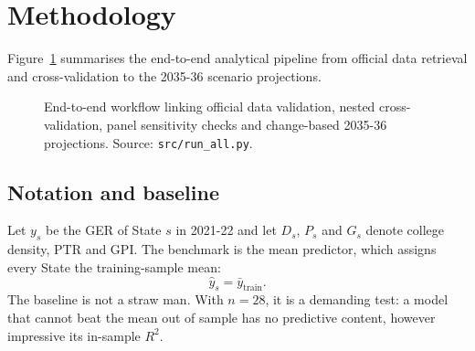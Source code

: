 \section{Methodology}\label{sec:methods}

Figure~\ref{fig:workflow} summarises the end-to-end analytical pipeline from official data retrieval and cross-validation to the 2035-36 scenario projections.

\begin{figure}[htbp]
\centering
{}
\caption{End-to-end workflow linking official data validation, nested cross-validation, panel sensitivity checks and change-based 2035-36 projections. Source: \texttt{src/run\_all.py}.}
\label{fig:workflow}
\end{figure}

\subsection{Notation and baseline}

Let \(y_s\) be the GER of State \(s\) in 2021-22 and let \(D_s\), \(P_s\) and \(G_s\) denote college density, PTR and GPI. The benchmark is the mean predictor, which assigns every State the training-sample mean:
\[
\hat{y}_s = \bar{y}_{\text{train}}.
\]
The baseline is not a straw man. With \(n = 28\), it is a demanding test: a model that cannot beat the mean out of sample has no predictive content, however impressive its in-sample \(R^2\).

